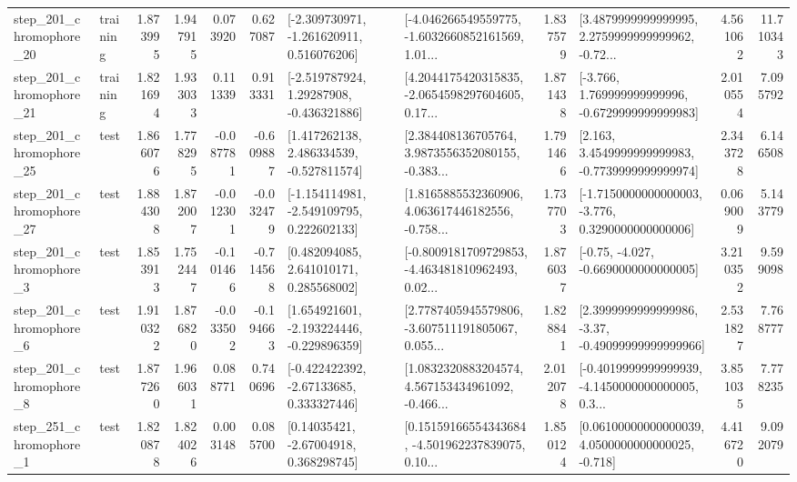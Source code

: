 \begin{tabular}{llrrrrllrlrr}
  step\_201\_chromophore\_20 &  training &      1.873995 &    1.947915 &      0.073920 &  0.627087 &   [-2.309730971, -1.261620911, 0.516076206] &  [-4.046266549559775, -1.6032660852161569, 1.01... &       1.837579 &  [3.4879999999999995, 2.2759999999999962, -0.72... &            4.561062 &         11.710343 \\
  step\_201\_chromophore\_21 &  training &      1.821694 &    1.933033 &      0.111339 &  0.913331 &    [-2.519787924, 1.29287908, -0.436321886] &  [4.2044175420315835, -2.0654598297604605, 0.17... &       1.871438 &   [-3.766, 1.769999999999996, -0.6729999999999983] &            2.010554 &          7.095792 \\
  step\_201\_chromophore\_25 &      test &      1.866076 &    1.778295 &     -0.087781 & -0.609887 &    [1.417262138, 2.486334539, -0.527811574] &  [2.384408136705764, 3.9873556352080155, -0.383... &       1.791466 &   [2.163, 3.4549999999999983, -0.7739999999999974] &            2.343728 &          6.146508 \\
  step\_201\_chromophore\_27 &      test &      1.884308 &    1.872007 &     -0.012301 & -0.032479 &   [-1.154114981, -2.549109795, 0.222602133] &  [1.8165885532360906, 4.063617446182556, -0.758... &       1.737703 &  [-1.7150000000000003, -3.776, 0.3290000000000006] &            0.069009 &          5.143779 \\
   step\_201\_chromophore\_3 &      test &      1.853913 &    1.752447 &     -0.101466 & -0.714568 &     [0.482094085, 2.641010171, 0.285568002] &  [-0.8009181709729853, -4.463481810962493, 0.02... &       1.876037 &               [-0.75, -4.027, -0.6690000000000005] &            3.210352 &          9.599098 \\
   step\_201\_chromophore\_6 &      test &      1.910322 &    1.876820 &     -0.033502 & -0.194663 &   [1.654921601, -2.193224446, -0.229896359] &  [2.7787405945579806, -3.607511191805067, 0.055... &       1.828841 &  [2.3999999999999986, -3.37, -0.49099999999999966] &            2.531827 &          7.768777 \\
   step\_201\_chromophore\_8 &      test &      1.877260 &    1.966031 &      0.088771 &  0.740696 &    [-0.422422392, -2.67133685, 0.333327446] &  [1.0832320883204574, 4.567153434961092, -0.466... &       2.012078 &  [-0.4019999999999939, -4.1450000000000005, 0.3... &            3.851035 &          7.778235 \\
   step\_251\_chromophore\_1 &      test &      1.820878 &    1.824026 &      0.003148 &  0.085700 &      [0.14035421, -2.67004918, 0.368298745] &  [0.15159166554343684, -4.501962237839075, 0.10... &       1.850124 &  [0.06100000000000039, 4.0500000000000025, -0.718] &            4.416720 &          9.092079 \\

\end{tabular}
